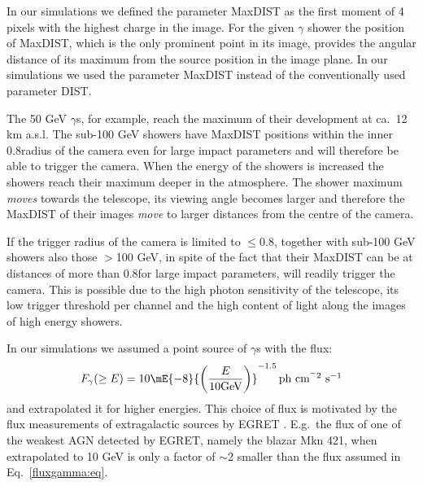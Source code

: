In our simulations we
defined the parameter MaxDIST as the first moment of 4 pixels with the
highest charge in the image.  For the given $\gamma$ shower the position
of MaxDIST, which is the only prominent point in its image, provides
the angular distance of its maximum from the source position in the
image plane.  In our simulations we used the parameter MaxDIST instead
of the conventionally used parameter DIST.

The 50 GeV $\gamma$s, for example, reach the maximum of their development
at ca.~12 km a.s.l. The sub-100 GeV showers have
MaxDIST positions within the inner 0.8\tdeg radius of the camera even for large
impact parameters and will therefore 
be able to trigger the camera. When
the energy of the showers is increased 
the showers reach their maximum 
deeper in the atmosphere. The shower maximum {\sl moves} towards the
telescope, its viewing angle becomes larger and therefore the
MaxDIST of their images {\sl move} to larger distances from the
centre of the camera.

If the trigger radius of the camera is limited to $\leq$0.8\tdeg,
together with sub-100 GeV showers also those $>$100 GeV, in spite of
the fact that their MaxDIST can be at distances of more than 
0.8\tdeg for
large impact parameters, will readily trigger the camera. This is
possible due to the high photon sensitivity of the telescope, its low
trigger threshold per channel and the high content of light along the
images of high energy showers.

In our simulations we assumed a point source of $\gamma$s with the flux:
\begin{equation}
F_{\gamma}(\geq E) = 10\mE{-8}                    
{\left(\frac{E}{10 {\rm GeV}}\right)}^{-1.5} \,
\mbox{ph cm$^{^-2}$ s$^{-1}$}
\label{fluxgamma:eq}
\end{equation}
and extrapolated it for higher energies. This choice
of flux is motivated by the flux measurements of
extragalactic sources by 
EGRET \cite{thompson:96,mukherjee:97}.
E.g.\ the flux of one of the weakest AGN detected by EGRET, namely the
blazar Mkn 421, when extrapolated to 10 GeV is only a factor of $\sim$2 smaller
than the flux assumed in Eq.~\ref{fluxgamma:eq}.
 

